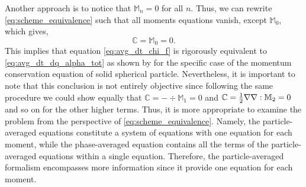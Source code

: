 Another approach is to notice that $\mathbb{M}_n=0$ for all $n$. Thus, we can rewrite \ref{eq:scheme_equivalence} such that all moments equations vanish, except $\mathbb{M}_0$, which gives, 
\begin{equation}
    \mathbb{C} = \mathbb{M}_0 = 0.
\end{equation}
This implies that equation \ref{eq:avg_dt_chi_f} is rigorously equivalent to \ref{eq:avg_dt_dq_alpha_tot} as shown by \cite[Appendix A]{nott2011suspension} for the specific case of the momentum conservation equation of solid spherical particle.
Nevertheless, it is important to note that this conclusion is not entirely objective since following the same procedure we could show equally that $\mathbb{C} = -\div\mathbb{M}_1=0$ and $\mathbb{C} = \frac{1}{2}\mathbf{\nabla}\mathbf{\nabla}:\mathbb{M}_2=0$ and so on for the other higher terms. 
Thus, it is more appropriate to examine the problem from the perspective of \ref{eq:scheme_equivalence}. 
Namely, the particle-averaged equations constitute a system of equations with one equation for each moment, while the phase-averaged equation contains all the terms of the particle-averaged equations within a single equation.
Therefore, the particle-averaged formalism encompasses more information since it provide one equation for each moment. 




